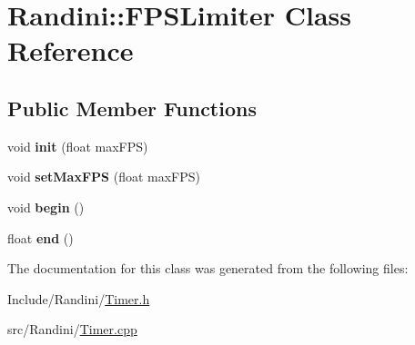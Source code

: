 \hypertarget{classRandini_1_1FPSLimiter}{
\section{Randini::FPSLimiter Class Reference}
\label{classRandini_1_1FPSLimiter}
}
\subsection*{Public Member Functions}
\begin{DoxyCompactItemize}
\item 
\hypertarget{classRandini_1_1FPSLimiter_a3024a959139c6a9b2d2c583200d69a0c}{
void {\bfseries init} (float maxFPS)}
\label{classRandini_1_1FPSLimiter_a3024a959139c6a9b2d2c583200d69a0c}

\item 
\hypertarget{classRandini_1_1FPSLimiter_ab791c46a558dc4f7dfca408f92563bf5}{
void {\bfseries setMaxFPS} (float maxFPS)}
\label{classRandini_1_1FPSLimiter_ab791c46a558dc4f7dfca408f92563bf5}

\item 
\hypertarget{classRandini_1_1FPSLimiter_ab3c41c74d451ebdcba9f448fd60efeaa}{
void {\bfseries begin} ()}
\label{classRandini_1_1FPSLimiter_ab3c41c74d451ebdcba9f448fd60efeaa}

\item 
\hypertarget{classRandini_1_1FPSLimiter_adde6384240089bf3e87ce5d5dc114c60}{
float {\bfseries end} ()}
\label{classRandini_1_1FPSLimiter_adde6384240089bf3e87ce5d5dc114c60}

\end{DoxyCompactItemize}


The documentation for this class was generated from the following files:\begin{DoxyCompactItemize}
\item 
Include/Randini/\hyperlink{Timer_8h}{Timer.h}\item 
src/Randini/\hyperlink{Timer_8cpp}{Timer.cpp}\end{DoxyCompactItemize}
